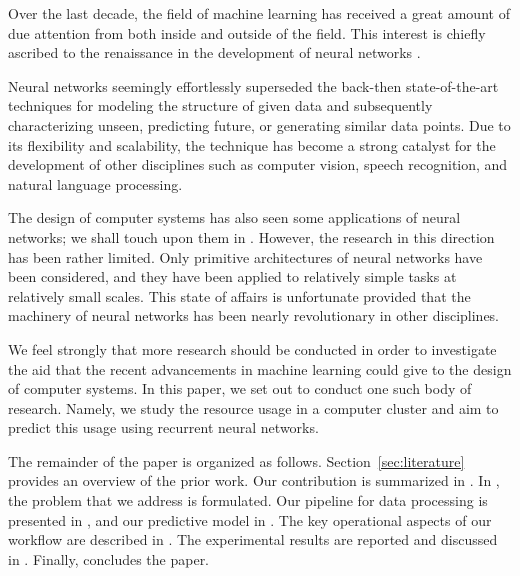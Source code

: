 Over the last decade, the field of machine learning has received a great amount
of due attention from both inside and outside of the field. This interest is
chiefly ascribed to the renaissance in the development of neural networks
\cite{goodfellow2016}.

Neural networks seemingly effortlessly superseded the back-then state-of-the-art
techniques for modeling the structure of given data and subsequently
characterizing unseen, predicting future, or generating similar data points. Due
to its flexibility and scalability, the technique has become a strong catalyst
for the development of other disciplines such as computer vision, speech
recognition, and natural language processing.

The design of computer systems has also seen some applications of neural
networks; we shall touch upon them in . However, the research
in this direction has been rather limited. Only primitive architectures of
neural networks have been considered, and they have been applied to relatively
simple tasks at relatively small scales. This state of affairs is unfortunate
provided that the machinery of neural networks has been nearly revolutionary in
other disciplines.

We feel strongly that more research should be conducted in order to investigate
the aid that the recent advancements in machine learning could give to the
design of computer systems. In this paper, we set out to conduct one such body
of research. Namely, we study the resource usage in a computer cluster and aim
to predict this usage using recurrent neural networks.

The remainder of the paper is organized as follows. Section~\ref{sec:literature}
provides an overview of the prior work. Our contribution is summarized in
. In , the problem that we address is
formulated. Our pipeline for data processing is presented in , and
our predictive model in . The key operational aspects of our
workflow are described in . The experimental results are
reported and discussed in . Finally,  concludes
the paper.
